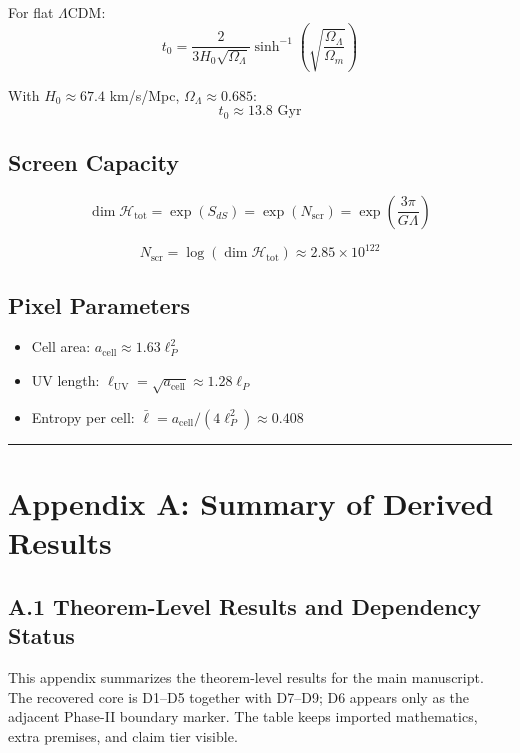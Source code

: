For flat \ensuremath{\Lambda}CDM: \[t_0 = \frac{2}{3H_0\sqrt{\Omega_\Lambda}} \sinh^{-1}\left(\sqrt{\frac{\Omega_\Lambda}{\Omega_m}}\right)\]

With \(H_0 \approx 67.4\) km/s/Mpc, \(\Omega_\Lambda \approx 0.685\): \[t_0 \approx 13.8 \text{ Gyr}\]

\subsection{Screen Capacity}\label{143-screen-capacity}

\[\dim \mathcal{H}_{\text{tot}} = \exp(S_{dS}) = \exp(N_{\mathrm{scr}}) = \exp\left(\frac{3\pi}{G\Lambda}\right)\]

\[N_{\mathrm{scr}} = \log(\dim \mathcal{H}_{\text{tot}}) \approx 2.85 \times 10^{122}\]

\subsection{Pixel Parameters}\label{144-pixel-parameters}

\begin{itemize}
\tightlist
\item
 Cell area: \(a_{\text{cell}} \approx 1.63 \ell_P^2\)
\item
 UV length: \(\ell_{\text{UV}} = \sqrt{a_{\text{cell}}} \approx 1.28 \ell_P\)
\item
 Entropy per cell: \(\bar{\ell} = a_{\text{cell}}/(4\ell_P^2) \approx 0.408\)
\end{itemize}

\begin{center}\rule{0.5\linewidth}{0.5pt}\end{center}

\section{Appendix A: Summary of Derived Results}\label{appendix-a-summary-of-derived-results}

\subsection{A.1 Theorem-Level Results and Dependency Status}\label{a1-theorem-level-results}

This appendix summarizes the theorem-level results for the main manuscript. The recovered core is D1--D5 together with D7--D9; D6 appears only as the adjacent Phase-II boundary marker. The table keeps imported mathematics, extra premises, and claim tier visible.

